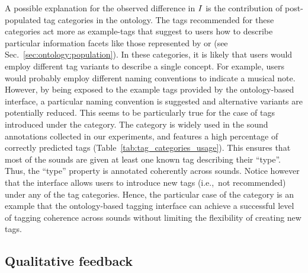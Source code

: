 A possible explanation for the observed difference in $I$ is the contribution of post-populated tag categories in the ontology. The tags recommended for these categories act more as example-tags that suggest to users how to describe particular information facets like those represented by  or  (see Sec.~\ref{sec:ontology:population}). In these categories, it is likely that users would employ different tag variants to describe a single concept. For example, users would probably employ different naming conventions to indicate a musical note. However, by being exposed to the example tags provided by the ontology-based interface, a particular naming convention is suggested and alternative variants are potentially reduced. 
This seems to be particularly true for the case of tags introduced under the  category. The  category is widely used in the sound annotations collected in our experiments, and features a high percentage of correctly predicted tags (Table~\ref{tab:tag_categories_usage}). This ensures that most of the sounds are given at least one known tag describing their ``type''. Thus, the ``type'' property is annotated coherently across sounds.
Notice however that the interface allows users to introduce new tags (i.e.,~not recommended) under any of the tag categories. Hence, the particular case of the  category is an example that the ontology-based tagging interface can achieve a successful level of tagging coherence across sounds without limiting the flexibility of creating new tags. 



\subsection{Qualitative feedback}
\label{sec:ontology:results_qualitative_feedback}

